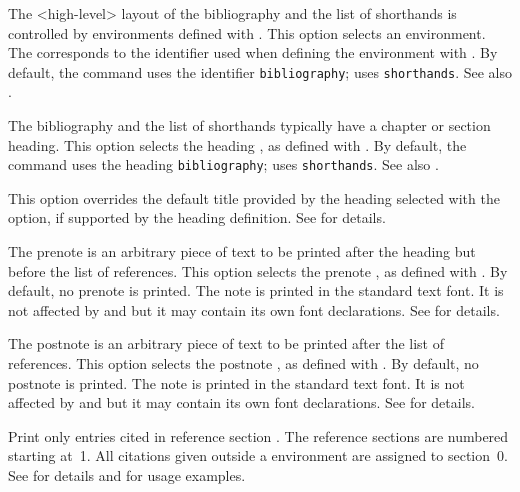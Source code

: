 \documentclass{ltxdockit}[2011/03/25]
\begin{document}
\begin{optionlist*}


The <high-level> layout of the bibliography and the list of shorthands is controlled by environments defined with . This option selects an environment. The  corresponds to the identifier used when defining the environment with . By default, the  command uses the identifier \texttt{bibliography};  uses \texttt{shorthands}. See also .


The bibliography and the list of shorthands typically have a chapter or section heading. This option selects the heading , as defined with . By default, the  command uses the heading \texttt{bibliography};  uses \texttt{shorthands}. See also .


This option overrides the default title provided by the heading selected with the  option, if supported by the heading definition. See  for details.


The prenote is an arbitrary piece of text to be printed after the heading but before the list of references. This option selects the prenote , as defined with . By default, no prenote is printed. The note is printed in the standard text font. It is not affected by  and  but it may contain its own font declarations. See  for details.


The postnote is an arbitrary piece of text to be printed after the list of references. This option selects the postnote , as defined with . By default, no postnote is printed. The note is printed in the standard text font. It is not affected by  and  but it may contain its own font declarations. See  for details.


Print only entries cited in reference section . The reference sections are numbered starting at~1. All citations given outside a  environment are assigned to section~0. See  for details and  for usage examples.


\end{optionlist*}
\end{document}
